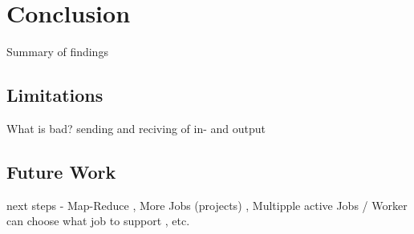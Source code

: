 \chapter{Conclusion}
\label{ch:conclusion}
Summary of findings

\section{Limitations}
\label{sec:conclusion:limitations}
What is bad? sending and reciving of in- and output

\section{Future Work}
\label{sec:conclusion:future_work}
next steps - Map-Reduce , More Jobs (projects) , Multipple active Jobs / Worker can choose what job to support , etc.
